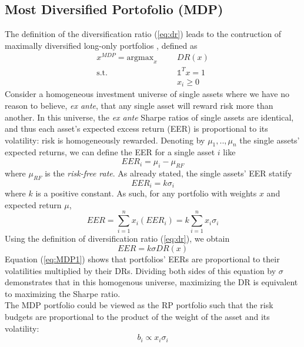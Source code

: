 \subsection{Most Diversified Portofolio (MDP)}
The definition of the diversification ratio (\ref{eq:dr}) leads to the contruction of maximally diversified long-only portfolios \cite{diversification}, defined as
\begin{equation}
\begin{aligned}
x^{MDP} = \mbox{argmax}_x &&&DR(x)\\
\text{s.t.}&&&\mathds{1}^T x = 1\\ 
&&&x_i \geq 0
\end{aligned}
\end{equation}
Consider a homogeneous investment universe of single assets where we have no reason to believe, \textit{ex ante}, that any single asset will reward risk more than another. In this universe, the \textit{ex ante} Sharpe ratios of single assets are identical, and thus each asset’s expected excess return (EER) is proportional to its volatility: risk is homogeneously rewarded. Denoting by $\mu_1,..,\mu_n$ the single assets' expected returns, we can define the EER for a single asset $i$ like
\begin{equation}
EER_i = \mu_i - \mu_{RF}
\end{equation}
where $\mu_{RF}$ is the \textit{risk-free rate}. As already stated, the single assets' EER statify
\begin{equation}
EER_i = k\sigma_i
\end{equation}
where $k$ is a positive constant. As such, for any portfolio with weights $x$ and expected return $\mu$,
\begin{equation}
EER = \sum_{i=1}^{n} x_i (EER_i) = k \sum_{i=1}^n x_i \sigma_i
\end{equation}
Using the definition of diversification ratio (\ref{eq:dr}), we obtain
\begin{equation}\label{eq:MDP1}
EER = k \sigma DR(x)
\end{equation}
Equation (\ref{eq:MDP1}) shows that portfolios’ EERs are proportional to their volatilities multiplied by their DRs. Dividing both sides of this equation by $\sigma$ demonstrates that in this homogenous universe, maximizing the DR is equivalent to maximizing the Sharpe ratio.\\
The MDP portfolio could be viewed as the RP portfolio such that the risk budgets are proportional to the product of the weight of the asset and its volatility\footnotemark[2]:
\begin{equation*}
b_i \propto x_i \sigma_i
\end{equation*}
